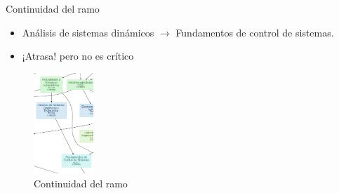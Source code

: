 \documentclass[
    10pt,
    aspectratio=169,
    xcolor={dvipsnames},
    spanish,
    ]{beamer}
\begin{document}
\begin{frame}{Continuidad del ramo}
  \begin{itemize}
    \item Análisis de sistemas dinámicos $\rightarrow$ Fundamentos de control de sistemas.
    \item ¡Atrasa! pero no es crítico
  \end{itemize}
  \begin{figure}
    \centering
    \includegraphics[width=0.2\textwidth]{Figura_1.png}
    \caption{Continuidad del ramo}
  \end{figure}
\end{frame}
\end{document}

